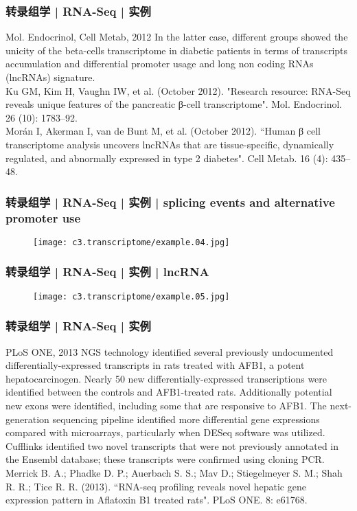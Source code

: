 \begin{frame}
  \frametitle{转录组学 | RNA-Seq | 实例}
  \begin{block}{Mol. Endocrinol, Cell Metab, 2012}
  In the latter case, different groups showed the unicity of the beta-cells transcriptome in diabetic patients in terms of transcripts accumulation and differential promoter usage and long non coding RNAs (lncRNAs) signature.\\
  \vspace{0.5em}
  Ku GM, Kim H, Vaughn IW, et al. (October 2012). "Research resource: RNA-Seq reveals unique features of the pancreatic β-cell transcriptome". Mol. Endocrinol. 26 (10): 1783–92.\\
  \vspace{0.5em}
  Morán I, Akerman I, van de Bunt M, et al. (October 2012). ``Human β cell transcriptome analysis uncovers lncRNAs that are tissue-specific, dynamically regulated, and abnormally expressed in type 2 diabetes". Cell Metab. 16 (4): 435–48. 
  \end{block}
\end{frame}

\begin{frame}
  \frametitle{转录组学 | RNA-Seq | 实例 | splicing events and alternative promoter use}
  \begin{figure}
    \centering
    \texttt{[image: c3.transcriptome/example.04.jpg]}
  \end{figure}
\end{frame}

\begin{frame}
  \frametitle{转录组学 | RNA-Seq | 实例 | lncRNA}
  \begin{figure}
    \centering
    \texttt{[image: c3.transcriptome/example.05.jpg]}
  \end{figure}
\end{frame}

\begin{frame}
  \frametitle{转录组学 | RNA-Seq | 实例}
  \begin{block}{PLoS ONE, 2013}
  NGS technology identified several previously undocumented differentially-expressed transcripts in rats treated with AFB1, a potent hepatocarcinogen. Nearly 50 new differentially-expressed transcriptions were identified between the controls and AFB1-treated rats. Additionally potential new exons were identified, including some that are responsive to AFB1. The next-generation sequencing pipeline identified more differential gene expressions compared with microarrays, particularly when DESeq software was utilized. Cufflinks identified two novel transcripts that were not previously annotated in the Ensembl database; these transcripts were confirmed using cloning PCR.\\
  \vspace{0.5em}
Merrick B. A.; Phadke D. P.; Auerbach S. S.; Mav D.; Stiegelmeyer S. M.; Shah R. R.; Tice R. R. (2013). ``RNA-seq profiling reveals novel hepatic gene expression pattern in Aflatoxin B1 treated rats". PLoS ONE. 8: e61768. 
  \end{block}
\end{frame}

